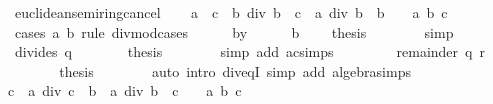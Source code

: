 \begin{isabellebody}
%
\endisadelimproof
\isanewline
{}\isamarkupfalse%
\ euclidean{\isacharunderscore}{\kern0pt}semiring{\isacharunderscore}{\kern0pt}cancel\isanewline
%
\isadelimproof
%
\endisadelimproof
%
\isatagproof
{}\isamarkupfalse%
\isanewline
\ \ \isamarkupfalse%
\ {\isachardoublequoteopen}{\isacharparenleft}{\kern0pt}a\ {\isacharplus}{\kern0pt}\ c\ {\isacharasterisk}{\kern0pt}\ b{\isacharparenright}{\kern0pt}\ div\ b\ {\isacharequal}{\kern0pt}\ c\ {\isacharplus}{\kern0pt}\ a\ div\ b{\isachardoublequoteclose}\ \ {\isachardoublequoteopen}b\ {\isasymnoteq}\ {}{\isachardoublequoteclose}\ \ a\ b\ c\isanewline
\ \ \isamarkupfalse%
\ {\isacharparenleft}{\kern0pt}cases\ a\ b\ rule{\isacharcolon}{\kern0pt}\ divmod{\isacharunderscore}{\kern0pt}cases{\isacharparenright}{\kern0pt}\isanewline
\ \ \ \ \isamarkupfalse%
\ by{}\isanewline
\ \ \ \ \isamarkupfalse%
\ {\isacartoucheopen}b\ {\isasymnoteq}\ {}{\isacartoucheclose}\ \isamarkupfalse%
\ {\isacharquery}{\kern0pt}thesis\isanewline
\ \ \ \ \ \ \isamarkupfalse%
\ simp\isanewline
\ \ \isamarkupfalse%
\isanewline
\ \ \ \ \isamarkupfalse%
\ {\isacharparenleft}{\kern0pt}divides\ q{\isacharparenright}{\kern0pt}\isanewline
\ \ \ \ \isamarkupfalse%
\ \isamarkupfalse%
\ {\isacharquery}{\kern0pt}thesis\isanewline
\ \ \ \ \ \ \isamarkupfalse%
\ {\isacharparenleft}{\kern0pt}simp\ add{\isacharcolon}{\kern0pt}\ ac{\isacharunderscore}{\kern0pt}simps{\isacharparenright}{\kern0pt}\isanewline
\ \ \isamarkupfalse%
\isanewline
\ \ \ \ \isamarkupfalse%
\ {\isacharparenleft}{\kern0pt}remainder\ q\ r{\isacharparenright}{\kern0pt}\isanewline
\ \ \ \ \isamarkupfalse%
\ \isamarkupfalse%
\ {\isacharquery}{\kern0pt}thesis\isanewline
\ \ \ \ \ \ \isamarkupfalse%
\ {\isacharparenleft}{\kern0pt}auto\ intro{\isacharcolon}{\kern0pt}\ div{\isacharunderscore}{\kern0pt}eqI\ simp\ add{\isacharcolon}{\kern0pt}\ algebra{\isacharunderscore}{\kern0pt}simps{\isacharparenright}{\kern0pt}\isanewline
\ \ \isamarkupfalse%
\isanewline
{}\isamarkupfalse%
\isanewline
\ \ \isamarkupfalse%
{\isachardoublequoteopen}{\isacharparenleft}{\kern0pt}c\ {\isacharasterisk}{\kern0pt}\ a{\isacharparenright}{\kern0pt}\ div\ {\isacharparenleft}{\kern0pt}c\ {\isacharasterisk}{\kern0pt}\ b{\isacharparenright}{\kern0pt}\ {\isacharequal}{\kern0pt}\ a\ div\ b{\isachardoublequoteclose}\ \ {\isachardoublequoteopen}c\ {\isasymnoteq}\ {}{\isachardoublequoteclose}\ \ a\ b\ c\isanewline

\end{isabellebody}
